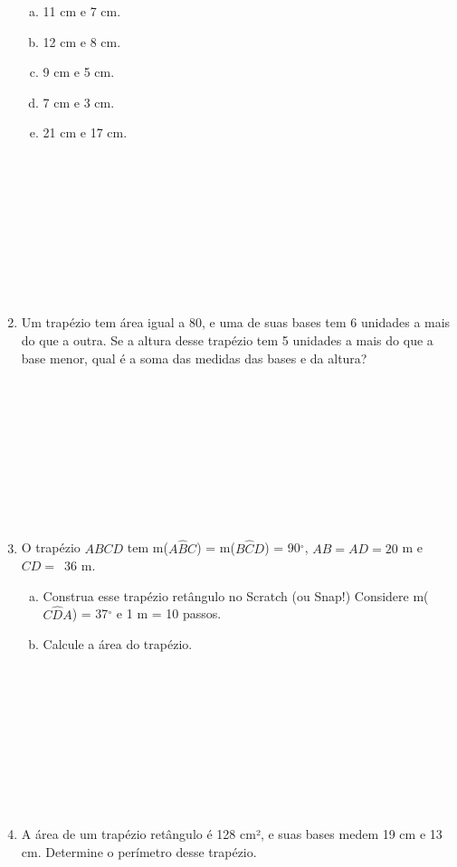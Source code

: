 \documentclass[a4paper,14pt]{article}
\begin{document}
\begin{multicols}{2}
\begin{enumerate}
	    	\begin{enumerate}[a)]
	    		\item 11 cm e 7 cm.
	    		\item 12 cm e 8 cm.
	    		\item 9 cm e 5 cm.
	    		\item 7 cm e 3 cm.
	    		\item 21 cm e 17 cm. \\\\\\\\\\\\\\\\\\\\
	        \end{enumerate}
            \item Um trapézio tem área igual a 80, e uma de suas bases tem 6 unidades a mais do que a outra. Se a altura desse trapézio tem 5 unidades a mais do que a base menor, qual é a soma das medidas das bases e da altura?  \\\\\\\\\\\\\\\\\\\\
            \item O trapézio $ABCD$ tem m($A\hat{B}C$) = m($B\hat{C}D$) = 90$^\circ$, $AB = AD = 20$ m e $CD = $~36 m.
            \begin{enumerate}[a)]
            	\item Construa esse trapézio retângulo no Scratch (ou Snap!) Considere m($C\hat{D}A$) = 37$^\circ$ e 1 m = 10 passos.
            	\item Calcule a área do trapézio. \\\\\\\\\\\\\\\\\\\\
            \end{enumerate}
        	\item A área de um trapézio retângulo é 128 cm², e suas bases medem 19 cm e 13 cm. Determine o perímetro desse trapézio.
   	    \end{enumerate}
    \end{multicols}
\end{document}
